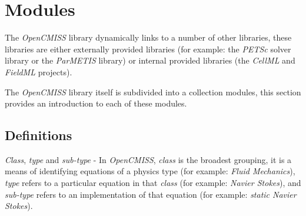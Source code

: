 \clearemptydoublepage
\chapter{Modules}
\label{cha:modules}


The \emph{OpenCMISS} library dynamically links to a number of 
other libraries, these libraries are either externally provided 
libraries (for example: the \emph{PETSc} solver library or the 
\emph{ParMETIS} library) or internal provided libraries (the 
\emph{CellML} and \emph{FieldML} projects). 

The \emph{OpenCMISS} library itself is subdivided into a collection modules,
this section provides an introduction to each of these modules.


\section{Definitions}
\label{sec:definitions}

\emph{Class}, \emph{type} and \emph{sub-type} - In \emph{OpenCMISS}, 
\emph{class} is the broadest grouping, it is a means of identifying 
equations of a physics type (for example: \emph{Fluid Mechanics}), 
\emph{type} refers to a particular equation in that \emph{class} 
(for example: \emph{Navier Stokes}), and \emph{sub-type} refers to 
an implementation of that equation (for example: 
\emph{static Navier Stokes}). \\

